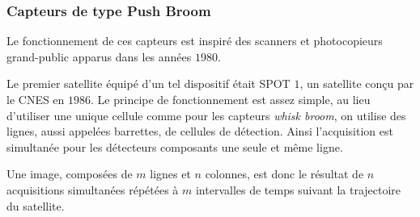 \documentclass[a4paper, 11pt]{report}
\begin{document}
\subsubsection{Capteurs de type Push Broom}
Le fonctionnement de ces capteurs est inspiré des scanners et photocopieurs grand-public apparus dans les années $1980$.

Le premier satellite équipé d'un tel dispositif était SPOT $1$, un satellite conçu par le CNES en $1986$.
Le principe de fonctionnement est assez simple, au lieu d'utiliser une unique cellule comme pour les capteurs \emph{whisk broom}, on utilise des lignes, aussi appelées barrettes, de cellules de détection.
Ainsi l'acquisition est simultanée pour les détecteurs composants une seule et même ligne.

Une image, composées de $m$ lignes et $n$ colonnes, est donc le résultat de $n$ acquisitions simultanées répétées à $m$ intervalles de temps suivant la trajectoire du satellite.
\end{document}
